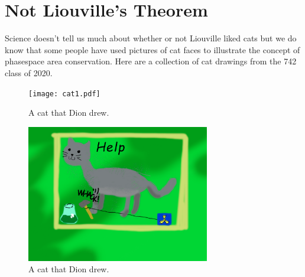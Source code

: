 \section{Not Liouville's Theorem}
Science doesn't tell us much about whether or not Liouville liked cats but we do know that some people have used pictures of cat faces to illustrate the concept of phasespace area conservation. 
Here are a collection of cat drawings from the 742 class of 2020.

\begin{centering}
\begin{figure}
	\texttt{[image: cat1.pdf]}
  \caption{A cat that Dion drew.}
  \label{fig:cat1}
\end{figure}
\end{centering}

\begin{centering}
\begin{figure}
	\includegraphics[width=8cm]{cat-gleb.pdf}
  \caption{A cat that Dion drew.}
  \label{fig:cat1}
\end{figure}
\end{centering}


\clearpage
